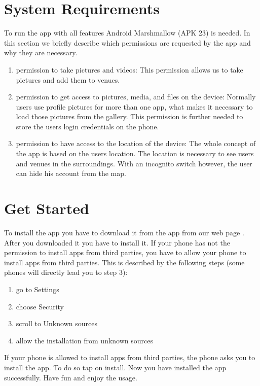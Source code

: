 \documentclass[11pt, accentcolor=tud1c]{tudreport}
\begin{document}
\section{System Requirements}\label{sec:system_requirements}
To run the app with all features Android Marshmallow (APK 23) is needed. 
In this section we briefly describe which permissions are requested by the app and why they are necessary.
\begin{enumerate}
\item permission to take pictures and videos: This permission allows us to take pictures and add them to venues.
\item permission to get access to pictures, media, and files on the device: Normally users use profile pictures for more than one app, what makes it necessary to load those pictures from the gallery. This permission is further needed to store the users login credentials on the phone.
\item permission to have access to the location of the device: The whole concept of the app is based on the users location. The location is necessary to see users and venues in the surroundings. With an incognito switch however, the user can hide his account from the map.
\end{enumerate}

\section{Get Started}
To install the app you have to download it from the app from our web page \cite{app}. After you downloaded it you have to install it. If your phone has not the permission to install apps from third parties, you have to allow your phone to install apps from third parties. This is described by the following steps (some phones will directly lead you to step 3):
\begin{enumerate}
\item go to Settings
\item choose Security
\item scroll to Unknown sources
\item allow the installation from unknown sources
\end{enumerate} 
If your phone is allowed to install apps from third parties, the phone asks you to install the app. To do so tap on install. Now you have installed the app successfully. Have fun and enjoy the usage.
\end{document}
